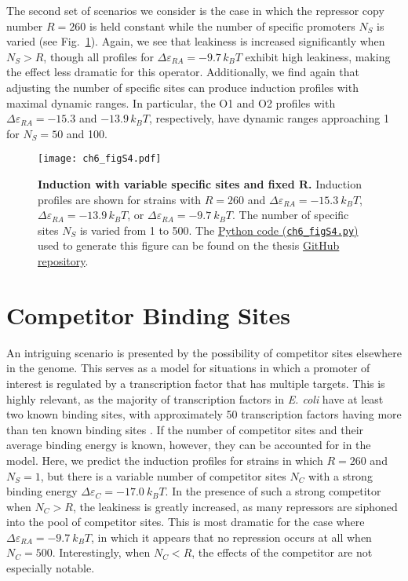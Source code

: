 \documentclass[12pt]{caltech_thesis}
\begin{document}
The second set of scenarios we consider is the case in which the
repressor copy number \(R=260\) is held constant while the number of
specific promoters \(N_S\) is varied (see Fig.~\ref{fig:fugacity_Ns}).
Again, we see that leakiness is increased significantly when
\(N_S > R\), though all profiles for
\(\Delta \varepsilon_{RA} = -9.7\, k_BT\) exhibit high leakiness, making
the effect less dramatic for this operator. Additionally, we find again
that adjusting the number of specific sites can produce induction
profiles with maximal dynamic ranges. In particular, the O1 and O2
profiles with \(\Delta \varepsilon_{RA} = -15.3\) and \(-13.9\, k_BT\),
respectively, have dynamic ranges approaching 1 for \(N_S = 50\) and
100.

\hypertarget{fig:fugacity_Ns}{%
\begin{figure}
\centering
\texttt{[image: ch6\_figS4.pdf]}
\caption[{Induction with variable specific sites and fixed
\(\boldsymbol{R}\).}]{\textbf{Induction with variable specific sites and
fixed \(\boldsymbol{R}\).} Induction profiles are shown for strains with
\(R=260\) and \(\Delta \varepsilon_{RA} = -15.3~k_BT\),
\(\Delta \varepsilon_{RA} = -13.9\,k_BT\), or
\(\Delta \varepsilon_{RA} = -9.7~k_BT\). The number of specific sites
\(N_S\) is varied from 1 to 500. The
\href{https://github.com/gchure/phd/blob/master/src/chapter_06/code/ch6_figS4.py}{Python
code (\texttt{ch6\_figS4.py})} used to generate this figure can be found
on the thesis \href{https://github.com/gchure/phd}{GitHub repository}.}
\label{fig:fugacity_Ns}
\end{figure}
}

\hypertarget{competitor-binding-sites}{%
\section{Competitor Binding Sites}\label{competitor-binding-sites}}

An intriguing scenario is presented by the possibility of competitor
sites elsewhere in the genome. This serves as a model for situations in
which a promoter of interest is regulated by a transcription factor that
has multiple targets. This is highly relevant, as the majority of
transcription factors in \emph{E. coli} have at least two known binding
sites, with approximately 50 transcription factors having more than ten
known binding sites \autocite{rydenfelt2014,schmidt2016}. If the number
of competitor sites and their average binding energy is known, however,
they can be accounted for in the model. Here, we predict the induction
profiles for strains in which \(R=260\) and \(N_S=1\), but there is a
variable number of competitor sites \(N_C\) with a strong binding energy
\(\Delta \varepsilon_C = -17.0~k_BT\). In the presence of such a strong
competitor when \(N_C > R\), the leakiness is greatly increased, as many
repressors are siphoned into the pool of competitor sites. This is most
dramatic for the case where \(\Delta \varepsilon_{RA} = -9.7~k_B T\), in
which it appears that no repression occurs at all when \(N_C = 500\).
Interestingly, when \(N_C < R\), the effects of the competitor are not
especially notable.
\end{document}
